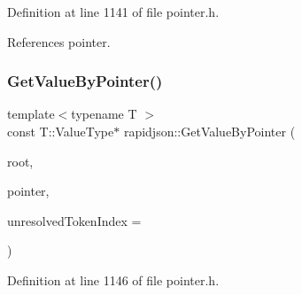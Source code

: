 Definition at line 1141 of file pointer.\+h.


\begin{DoxyCode}{0}

\end{DoxyCode}


References pointer.

\mbox{\label{namespacerapidjson_a6ca286bdc96a69351dcaaa55dea8c03a}} 
\subsubsection{\texorpdfstring{GetValueByPointer()}{GetValueByPointer()}\hspace{0.1cm}{\footnotesize\ttfamily [2/4]}}
{\footnotesize\ttfamily template$<$typename T $>$ \\
const T\+::\+Value\+Type$\ast$ rapidjson\+::\+Get\+Value\+By\+Pointer (\begin{DoxyParamCaption}\item[{const T \&}]{root,  }\item[{const \mbox{\hyperlink{classrapidjson_1_1_generic_pointer}{Generic\+Pointer}}$<$ typename T\+::\+Value\+Type $>$ \&}]{pointer,  }\item[{size\+\_\+t $\ast$}]{unresolved\+Token\+Index = {} }\end{DoxyParamCaption})}



Definition at line 1146 of file pointer.\+h.


\begin{DoxyCode}{0}

\end{DoxyCode}


